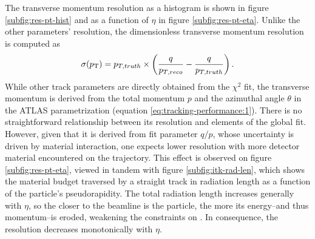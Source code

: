 \newpage
The transverse momentum resolution as a histogram is shown in figure \ref{subfig:res-pt-hist} and as a function of $\eta$ in figure \ref{subfig:res-pt-eta}.
Unlike the other parameters' resolution, the dimensionless transverse momentum resolution is computed as $$
\sigma(p_{\text{T}}) = p_{T,truth}  \times \left ( \frac{q}{p_{T, reco}} - \frac{q}{p_{T, truth}} \right).$$
While other track parameters are directly obtained from the $\chi^2$ fit, the transverse momentum is derived from the total momentum $p$ and the azimuthal angle $\theta$ in the ATLAS parametrization (equation \eqref{eq:tracking-performance:1}). 
There is no straightforward relationship between its resolution and elements of the global fit.
However, given that it is derived from fit parameter $q/p$, whose uncertainty is driven by material interaction, one expects lower \pT resolution with more detector material encountered on the trajectory.
This effect is observed on figure \ref{subfig:res-pt-eta},  viewed in tandem with figure \ref{subfig:itk-rad-len}, which shows the material budget traversed by a straight track in radiation length as a function of the particle's pseudorapidity.
The total radiation length increases generally with $\eta$, so the closer to the beamline is the particle, the more its energy--and thus momentum--is eroded, weakening the constraints on \pT. 
In consequence, the \pT resolution decreases monotonically with $\eta$.

